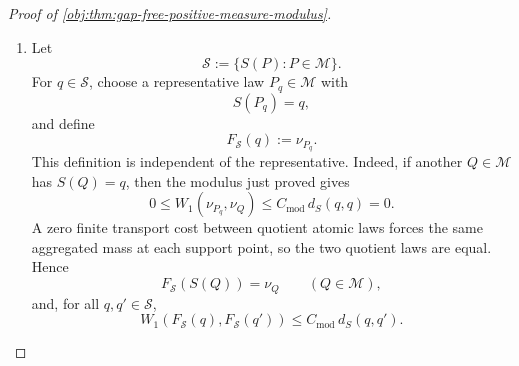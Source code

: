 \documentclass[11pt]{article}
\begin{document}
\begin{proof}[Proof of \cref{obj:thm:gap-free-positive-measure-modulus}]
\begin{enumerate}
\[\begin{cases}
0,
&\zeta_P=\zeta_Q,\\[2mm]
\dfrac{\varphi(\zeta_P)-\varphi(\zeta_Q)}{\zeta_P-\zeta_Q}\,
\mathsf{Proj}_P(\zeta_P)(\mathfrak D_P-\mathfrak D_Q)\mathsf{Proj}_Q(\zeta_Q),
&\zeta_P\ne\zeta_Q .
\end{cases}
\]
The equal-spectral-value branch is zero by the preceding vanishing identity.  In the unequal branch, the one-Lipschitz property gives
\[
\left|
\frac{\varphi(\zeta_P)-\varphi(\zeta_Q)}{\zeta_P-\zeta_Q}
\right|\le1,
\]
and therefore
\[
\|\Xi(\zeta_P,\zeta_Q)\|_{\mathrm{op}}
\le
\kappa_\star^2\|\mathfrak D_P-\mathfrak D_Q\|_{\mathrm{op}}.
\]
Because \(|\Omega_P|\le d_x\) and \(|\Omega_Q|\le d_x\), the triangle inequality gives
\[
\|\varphi(\mathfrak D_P)-\varphi(\mathfrak D_Q)\|_{\mathrm{op}}
\le
d_x^2\kappa_\star^2
\|\mathfrak D_P-\mathfrak D_Q\|_{\mathrm{op}}.
\]
Also,
\[
\|\varphi(\mathfrak D_P)\|_{\mathrm{op}}
\le \kappa_\star L_\tau,
\]
because \(\varphi(0)=0\), \(\varphi\) is one-Lipschitz, and every eigenvalue of \(\mathfrak D_P\) lies in \([-L_\tau,L_\tau]\).

Using the representation identity for \(P\) and \(Q\),
\[
\begin{aligned}
W_1(\nu_P,\nu_Q)
&\le
\|m_X(P)-m_X(Q)\|_2\,\|\varphi(\mathfrak D_P)\|_{\mathrm{op}}\|e_1\|_2\\
&\quad+
\|m_X(Q)\|_2\,
\|\varphi(\mathfrak D_P)-\varphi(\mathfrak D_Q)\|_{\mathrm{op}}\|e_1\|_2\\
&\le
C_{\mathrm{base}}\,d_S(S(P),S(Q))
\le
C_{\mathrm{mod}}\,d_S(S(P),S(Q)).
\end{aligned}
\]
This proves the asserted modulus on model summaries:
\begin{equation}
W_1(\nu_P,\nu_Q)
\le C_{\mathrm{mod}}d_S(S(P),S(Q)).
\label{eq:gap-free-model-summary-control}
\end{equation}

\item Let
\[
\mathscr S:=\{S(P):P\in\mathcal M\}.
\]
For \(q\in\mathscr S\), choose a representative law \(P_q\in\mathcal M\) with
\[
S(P_q)=q,
\]
and define
\[
F_{\mathscr S}(q):=\nu_{P_q}.
\]
This definition is independent of the representative.  Indeed, if another \(Q\in\mathcal M\) has \(S(Q)=q\), then the modulus just proved gives
\[
0\le W_1(\nu_{P_q},\nu_Q)
\le C_{\mathrm{mod}}\,d_S(q,q)=0.
\]
A zero finite transport cost between quotient atomic laws forces the same aggregated mass at each support point, so the two quotient laws are equal.  Hence
\[
F_{\mathscr S}(S(Q))=\nu_Q
\qquad(Q\in\mathcal M),
\]
and, for all \(q,q'\in\mathscr S\),
\[
W_1(F_{\mathscr S}(q),F_{\mathscr S}(q'))
\le
C_{\mathrm{mod}}\,d_S(q,q').
\]


\end{enumerate}
\end{proof}
\end{document}
